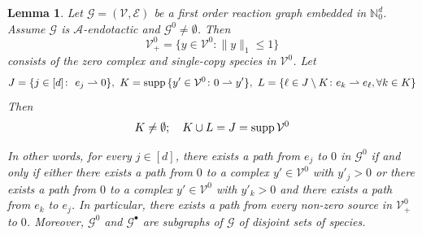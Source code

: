 \documentclass[10pt]{amsart}
\numberwithin{equation}{section}
\theoremstyle{plain}
\newtheorem{lemma}[theorem]{Lemma}
\theoremstyle{definition}
\theoremstyle{remark}
\newcommand{\cA}{\mathcal{A}}
\newcommand{\cE}{\mathcal{E}}
\newcommand{\cG}{\mathcal{G}}
\newcommand{\cV}{\mathcal{V}}
\newcommand{\supp}{{\rm supp\,}}
\begin{document}
\begin{lemma}\label{le:path-back-to-0}
Let $\cG=(\cV,\cE)$ be a first order reaction graph embedded in $\mathbb{N}^d_0$. Assume $\cG$ is $\cA$-endotactic and  $\cG^0\neq\emptyset$. 
Then \begin{equation}\label{eq:sources}
\cV_+^0=\{y\in\cV^0\colon \|y\|_1\le1\}
\end{equation} consists of the zero complex and single-copy species in $\cV^0$. Let  $$J=\{j\in[d]\colon\ e_j\rightharpoonup 0\},\ K=\supp\{y'\in\cV^0 \colon 0\rightharpoonup y'\},\ L=\{\ell\in J\setminus K\colon e_{k}\rightharpoonup e_{\ell}, \forall k\in K\}$$ Then
\begin{equation}\label{eq:support_of_non-zero_sources}
K\neq\emptyset;\quad K\cup L= J = \supp\cV^0
\end{equation}

 In other words, for every $j\in[d]$, there exists a path from $e_j$ to $0$ in $\cG^0$ if and only if either there exists a path from $0$ to a complex $y'\in\cV^0$ with $y'_j>0$ or there exists a path from $0$ to a complex $y'\in\cV^0$ with $y'_{k}>0$ and there exists a path from $e_{k}$ to $e_j$.
 In particular, there exists a path from every non-zero source in $\cV^0_+$ to $0$. 
Moreover, $\cG^0$ and $\cG^{\bullet}$ are subgraphs of $\cG$ of disjoint sets of species.
\end{lemma}
\end{document}
